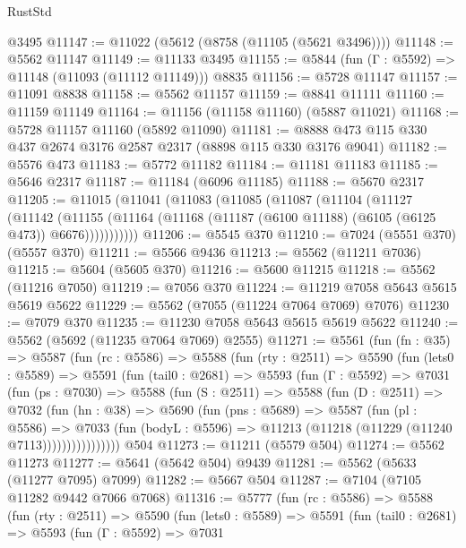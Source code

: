 \begin{lexlean}{RustStd}
\begin{coremodule}
    @3495
@11147 := @11022 (@5612 (@8758 (@11105 (@5621 @3496))))
@11148 := @5562 @11147
@11149 := @11133 @3495
@11155 := @5844 (fun (Γ : @5592) => @11148 (@11093 (@11112 @11149))) @8835
@11156 := @5728 @11147
@11157 := @11091 @8838
@11158 := @5562 @11157
@11159 := @8841 @11111
@11160 := @11159 @11149
@11164 := @11156 (@11158 @11160) (@5887 @11021)
@11168 := @5728 @11157 @11160 (@5892 @11090)
@11181 := @8888 @473 @115 @330 @437 @2674 @3176 @2587 @2317 (@8898 @115 @330 @3176 @9041)
@11182 := @5576 @473
@11183 := @5772 @11182
@11184 := @11181 @11183
@11185 := @5646 @2317
@11187 := @11184 (@6096 @11185)
@11188 := @5670 @2317
@11205 := @11015
    (@11041
      (@11083
        (@11085
          (@11087
            (@11104
              (@11127
                (@11142
                  (@11155
                    (@11164 (@11168 (@11187 (@6100 @11188) (@6105 (@6125 @473)) @6676)))))))))))
@11206 := @5545 @370
@11210 := @7024 (@5551 @370) (@5557 @370)
@11211 := @5566 @9436
@11213 := @5562 (@11211 @7036)
@11215 := @5604 (@5605 @370)
@11216 := @5600 @11215
@11218 := @5562 (@11216 @7050)
@11219 := @7056 @370
@11224 := @11219 @7058 @5643 @5615 @5619 @5622
@11229 := @5562 (@7055 (@11224 @7064 @7069) @7076)
@11230 := @7079 @370
@11235 := @11230 @7058 @5643 @5615 @5619 @5622
@11240 := @5562 (@5692 (@11235 @7064 @7069) @2555)
@11271 := @5561
    (fun (fn : @35) =>
    @5587
      (fun (rc : @5586) =>
      @5588
        (fun (rty : @2511) =>
        @5590
          (fun (lets0 : @5589) =>
          @5591
            (fun (tail0 : @2681) =>
            @5593
              (fun (Γ : @5592) =>
              @7031
                (fun (ps : @7030) =>
                @5588
                  (fun (S : @2511) =>
                  @5588
                    (fun (D : @2511) =>
                    @7032
                      (fun (hn : @38) =>
                      @5690
                        (fun (pns : @5689) =>
                        @5587
                          (fun (pl : @5586) =>
                          @7033
                            (fun (bodyL : @5596) =>
                            @11213 (@11218 (@11229 (@11240 @7113))))))))))))))))
    @504
@11273 := @11211 (@5579 @504)
@11274 := @5562 @11273
@11277 := @5641 (@5642 @504) @9439
@11281 := @5562 (@5633 (@11277 @7095) @7099)
@11282 := @5667 @504
@11287 := @7104 (@7105 @11282 @9442 @7066 @7068)
@11316 := @5777
    (fun (rc : @5586) =>
    @5588
      (fun (rty : @2511) =>
      @5590
        (fun (lets0 : @5589) =>
        @5591
          (fun (tail0 : @2681) =>
          @5593
            (fun (Γ : @5592) =>
            @7031

\end{coremodule}
\end{lexlean}
